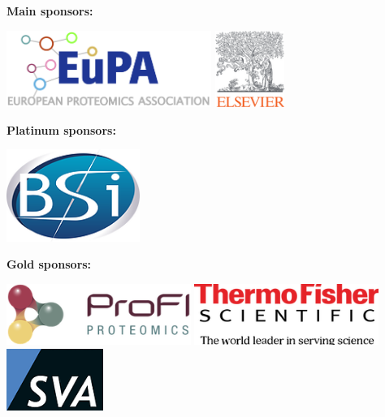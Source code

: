 \textbf{Main sponsors:}
\begin{center}
  \includegraphics[height=2.5cm]{graphics/eupa-logo}\hspace*{2cm}
  \includegraphics[height=2.5cm]{graphics/ELS_Logo_Orange_RGB}
\end{center}
\vspace*{1.5cm}
\noindent\textbf{Platinum sponsors:}
\begin{center}
  \includegraphics[height=3cm]{graphics/Bioinformatics_Solutions_Inc__svg}
\end{center}
\vspace*{1.5cm}
\noindent\textbf{Gold sponsors:}
\begin{center}
  \includegraphics[height=2cm]{graphics/logo_ProFi}\hspace*{1cm}
  \includegraphics[height=2cm]{graphics/thermo-logo}\hspace*{1cm}
  \includegraphics[height=2cm]{graphics/sva_logo}
\end{center}
